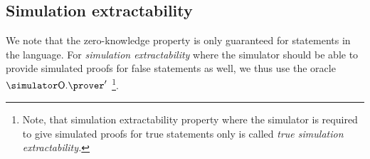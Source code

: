 \subsection{Simulation extractability}
We note that the zero-knowledge property is only guaranteed for statements in the
language.
For \emph{simulation extractability} where the simulator
should be able to provide simulated proofs for false statements as well, we thus use the oracle $\simulator\oracleo.\prover'$
\footnote{Note,
  that simulation extractability property where the simulator is required to give
  simulated proofs for true statements only is called \emph{true simulation
    extractability.}}. 
	
